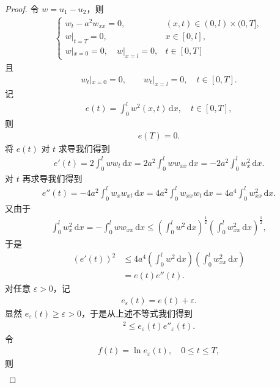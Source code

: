 \documentclass[../../main.tex]{subfiles}%
\begin{document}
\begin{proof}
令 $w=u_1-u_2$，则
\begin{align*}
\begin{cases}
w_t-a^2w_{xx}=0, & (x,t)\in(0,l)\times(0,T],\\
w|_{t=T}=0, & x\in[0,l],\\
w|_{x=0}=0,\quad w|_{x=l}=0, & t\in[0,T]
\end{cases}
\end{align*}
且
\begin{align*}
w_t|_{x=0}=0,\qquad w_t|_{x=l}=0,\quad t\in[0,T].
\end{align*}
记
\begin{align*}
e(t)=\int_0^l w^2(x,t)\,\mathrm{d}x,\quad t\in[0,T],
\end{align*}
则
\begin{align*}
e(T)=0.
\end{align*}
将 $e(t)$ 对 $t$ 求导我们得到
\begin{align*}
e'(t)=2\int_0^l w w_t\,\mathrm{d}x=2a^2\int_0^l w w_{xx}\,\mathrm{d}x=-2a^2\int_0^l w_x^2\,\mathrm{d}x.
\end{align*}
对 $t$ 再求导我们得到
\begin{align*}
e''(t)=-4a^2\int_0^l w_x w_{xt}\,\mathrm{d}x=4a^2\int_0^l w_{xx}w_t\,\mathrm{d}x=4a^4\int_0^l w_{xx}^2\,\mathrm{d}x.
\end{align*}
又由于
\begin{align*}
\int_0^l w_x^2\,\mathrm{d}x=-\int_0^l w w_{xx}\,\mathrm{d}x
\leqslant \left(\int_0^l w^2\,\mathrm{d}x\right)^{\frac{1}{2}}\left(\int_0^l w_{xx}^2\,\mathrm{d}x\right)^{\frac{1}{2}},
\end{align*}
于是
\begin{align*}
(e'(t))^2 &\leqslant 4a^4\left(\int_0^l w^2\,\mathrm{d}x\right)\left(\int_0^l w_{xx}^2\,\mathrm{d}x\right) \\
&=e(t)e''(t).
\end{align*}
对任意 $\varepsilon>0$，记
\begin{align*}
e_\varepsilon(t)=e(t)+\varepsilon.
\end{align*}
显然 $e_\varepsilon(t)\geqslant \varepsilon>0$，于是从上述不等式我们得到
\begin{align*}
[e'_\varepsilon(t)]^2\leqslant e_\varepsilon(t)e''_\varepsilon(t).
\end{align*}
令
\begin{align*}
f(t)=\ln e_\varepsilon(t),\quad 0\leqslant t\leqslant T,
\end{align*}
则
\begin{align*}

\end{align*}
\end{proof}
\end{document}
